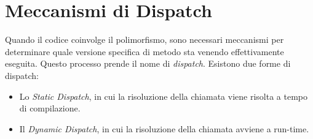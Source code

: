 \section{Meccanismi di Dispatch}
Quando il codice coinvolge il polimorfismo, sono necessari meccanismi per determinare quale versione specifica di metodo sta venendo effettivamente eseguita. Questo processo prende il nome di \textit{dispatch}. Esistono due forme di dispatch: 
\begin{itemize}
    \item Lo \textit{Static Dispatch}, in cui la risoluzione della chiamata viene risolta a tempo di compilazione.
    \item Il \textit{Dynamic Dispatch}, in cui la risoluzione della chiamata avviene a run-time. 
\end{itemize}

